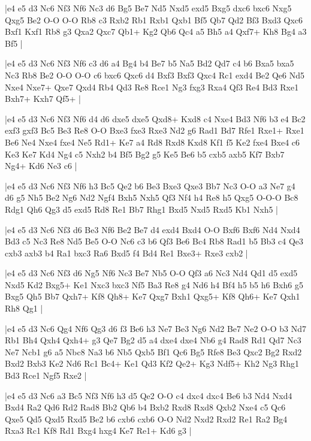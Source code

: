 \whitename{}
\blackname{}
\makegametitle
|e4 e5 d3 Nc6 Nf3 Nf6 Nc3 d6 Bg5 Be7 Nd5 Nxd5 exd5 Bxg5 dxc6 bxc6 Nxg5 Qxg5 Be2 O-O O-O Rb8 c3 Rxb2 Rb1 Rxb1 Qxb1 Bf5 Qb7 Qd2 Bf3 Bxd3 Qxc6 Bxf1 Kxf1 Rb8 g3 Qxa2 Qxc7 Qb1+ Kg2 Qb6 Qc4 a5 Bh5 a4 Qxf7+ Kh8 Bg4 a3 Bf5  |

\whitename{}
\blackname{}
\makegametitle
|e4 e5 d3 Nc6 Nf3 Nf6 c3 d6 a4 Bg4 b4 Be7 b5 Na5 Bd2 Qd7 c4 b6 Bxa5 bxa5 Nc3 Rb8 Be2 O-O O-O c6 bxc6 Qxc6 d4 Bxf3 Bxf3 Qxc4 Rc1 exd4 Be2 Qe6 Nd5 Nxe4 Nxe7+ Qxe7 Qxd4 Rb4 Qd3 Re8 Rce1 Ng3 fxg3 Rxa4 Qf3 Re4 Bd3 Rxe1 Bxh7+ Kxh7 Qf5+  |

\whitename{}
\blackname{}
\makegametitle
|e4 e5 d3 Nc6 Nf3 Nf6 d4 d6 dxe5 dxe5 Qxd8+ Kxd8 c4 Nxe4 Bd3 Nf6 b3 e4 Bc2 exf3 gxf3 Bc5 Be3 Re8 O-O Bxe3 fxe3 Rxe3 Nd2 g6 Rad1 Bd7 Rfe1 Rxe1+ Rxe1 Be6 Ne4 Nxe4 fxe4 Ne5 Rd1+ Ke7 a4 Rd8 Rxd8 Kxd8 Kf1 f5 Ke2 fxe4 Bxe4 c6 Ke3 Ke7 Kd4 Ng4 c5 Nxh2 b4 Bf5 Bg2 g5 Ke5 Be6 b5 cxb5 axb5 Kf7 Bxb7 Ng4+ Kd6 Ne3 c6  |

\whitename{}
\blackname{}
\makegametitle
|e4 e5 d3 Nc6 Nf3 Nf6 h3 Bc5 Qe2 b6 Be3 Bxe3 Qxe3 Bb7 Nc3 O-O a3 Ne7 g4 d6 g5 Nh5 Be2 Ng6 Nd2 Ngf4 Bxh5 Nxh5 Qf3 Nf4 h4 Re8 h5 Qxg5 O-O-O Bc8 Rdg1 Qh6 Qg3 d5 exd5 Rd8 Re1 Bb7 Rhg1 Bxd5 Nxd5 Rxd5 Kb1 Nxh5  |

\whitename{}
\blackname{}
\makegametitle
|e4 e5 d3 Nc6 Nf3 d6 Be3 Nf6 Be2 Be7 d4 exd4 Bxd4 O-O Bxf6 Bxf6 Nd4 Nxd4 Bd3 c5 Nc3 Re8 Nd5 Be5 O-O Nc6 c3 b6 Qf3 Be6 Bc4 Rb8 Rad1 b5 Bb3 c4 Qe3 cxb3 axb3 b4 Ra1 bxc3 Ra6 Bxd5 f4 Bd4 Re1 Bxe3+ Rxe3 cxb2  |

\whitename{}
\blackname{}
\makegametitle
|e4 e5 d3 Nc6 Nf3 d6 Ng5 Nf6 Nc3 Be7 Nb5 O-O Qf3 a6 Nc3 Nd4 Qd1 d5 exd5 Nxd5 Kd2 Bxg5+ Ke1 Nxc3 bxc3 Nf5 Ba3 Re8 g4 Nd6 h4 Bf4 h5 b5 h6 Bxh6 g5 Bxg5 Qh5 Bb7 Qxh7+ Kf8 Qh8+ Ke7 Qxg7 Bxh1 Qxg5+ Kf8 Qh6+ Ke7 Qxh1 Rh8 Qg1  |

\whitename{}
\blackname{}
\makegametitle
|e4 e5 d3 Nc6 Qg4 Nf6 Qg3 d6 f3 Be6 h3 Ne7 Be3 Ng6 Nd2 Be7 Ne2 O-O b3 Nd7 Rb1 Bh4 Qxh4 Qxh4+ g3 Qe7 Bg2 d5 a4 dxe4 dxe4 Nb6 g4 Rad8 Rd1 Qd7 Nc3 Ne7 Ncb1 g6 a5 Nbc8 Na3 b6 Nb5 Qxb5 Bf1 Qc6 Bg5 Rfe8 Be3 Qxc2 Bg2 Rxd2 Bxd2 Bxb3 Ke2 Nd6 Rc1 Bc4+ Ke1 Qd3 Kf2 Qe2+ Kg3 Ndf5+ Kh2 Ng3 Rhg1 Bd3 Rce1 Ngf5 Rxe2  |

\whitename{}
\blackname{}
\makegametitle
|e4 e5 d3 Nc6 a3 Bc5 Nf3 Nf6 h3 d5 Qe2 O-O c4 dxc4 dxc4 Be6 b3 Nd4 Nxd4 Bxd4 Ra2 Qd6 Rd2 Rad8 Bb2 Qb6 b4 Bxb2 Rxd8 Rxd8 Qxb2 Nxe4 c5 Qc6 Qxe5 Qd5 Qxd5 Rxd5 Be2 b6 cxb6 cxb6 O-O Nd2 Nxd2 Rxd2 Re1 Ra2 Bg4 Rxa3 Rc1 Kf8 Rd1 Bxg4 hxg4 Ke7 Re1+ Kd6 g3  |

